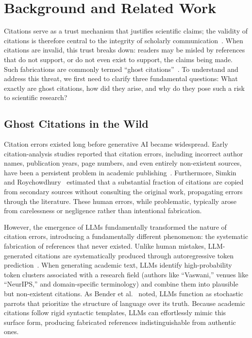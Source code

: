 \section{Background and Related Work}
\label{sec:background}

Citations serve as a trust mechanism that justifies scientific claims; the validity of citations is therefore central to the integrity of scholarly communication~\cite{greenberg2009how}.
When citations are invalid, this trust breaks down: readers may be misled by references that do not support, or do not even exist to support, the claims being made.
Such fabrications are commonly termed ``ghost citations''~\cite{consultmu2026ghost,tay2025why}.
To understand and address this threat, we first need to clarify three fundamental questions: What exactly are ghost citations, how did they arise, and why do they pose such a risk to scientific research?

\subsection{Ghost Citations in the Wild}
\label{sec:background:ghost}
Citation errors existed long before generative AI became widespread.
Early citation-analysis studies reported that citation errors, including incorrect author names, publication years, page numbers, and even entirely non-existent sources, have been a persistent problem in academic publishing~\cite{sweetland1989errors}.
Furthermore, Simkin and Roychowdhury~\cite{simkin2005stochastic} estimated that a substantial fraction of citations are copied from secondary sources without consulting the original work, propagating errors through the literature.
These human errors, while problematic, typically arose from carelessness or negligence rather than intentional fabrication.

However, the emergence of LLMs fundamentally transformed the nature of citation errors, introducing a fundamentally different phenomenon: the systematic fabrication of references that never existed\cite{oladokun2025hallucitation}.
Unlike human mistakes, LLM-generated citations are systematically produced through autoregressive token prediction~\cite{vaswani2017attention}.
When generating academic text, LLMs identify high-probability token clusters associated with a research field (authors like ``Vaswani,'' venues like ``NeurIPS,'' and domain-specific terminology) and combine them into plausible but non-existent citations.
As Bender et al.~\cite{bender2021dangers} noted, LLMs function as stochastic parrots that prioritize the structure of language over its truth.
Because academic citations follow rigid syntactic templates, LLMs can effortlessly mimic this surface form, producing fabricated references indistinguishable from authentic ones.

